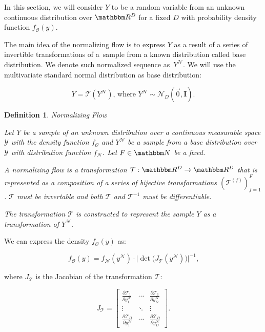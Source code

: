 \documentclass[shortabstract]{iithesis}
\newtheorem{definition}{Definition}
\begin{document}
In this section, we will consider $Y$ to be a random variable from an unknown continuous distribution over $\mathbbm R ^D$ for a fixed $D$ with probability density function $f_{\mathcal O} (y)$.

The main idea of the normalizing flow is to express $Y$ as a result of a series of invertible transformations of a~sample from a known distribution called base distribution. We denote such normalized sequence as~$Y^{\mathcal N}$. We will use the multivariate standard normal distribution as base distribution:

\begin{equation*}
    Y = \mathcal T (Y^{\mathcal N}) \text{, where } Y^{\mathcal N} \sim \mathcal N_D(\vec{0},  \textbf{I})\text{.}
\end{equation*}

\begin{definition} {Normalizing Flow}

    Let $Y$ be a sample of an unknown distribution over a continuous measurable space $\mathcal Y$ with the density function $f_{\mathcal O}$ and $Y^{\mathcal N}$ be a sample from a base distribution over $\mathcal Y$ with distribution function $f_{\mathcal N}$. Let $F \in \mathbbm N$ be a fixed.

    A normalizing flow is a transformation $\mathcal T: \mathbbm R ^D \rightarrow \mathbbm R ^D$ that is represented as a composition of a series of bijective transformations $(\mathcal T^{(f)})_{f=1}^F$. $\mathcal T$ must be invertable and both $\mathcal T$ and $\mathcal T^{-1}$ must be differentiable. 
    
    The transformation $\mathcal T$ is constructed to represent the sample $Y$ as a transformation of $Y^{\mathcal N}$. 
\end{definition}



We can express the density $f_{\mathcal O} (y)$ as:

\begin{equation} \label{eq:fo}
    f_{\mathcal O} (y) = f_{\mathcal N} (y^{\mathcal N}) \cdot \Big| \det \big(J_{\mathcal T}(y^{\mathcal N})\big) \Big| ^{-1}\text{,}
\end{equation}

where $J_{\mathcal T}$ is the Jacobian of the transformation $\mathcal T$:

\begin{equation*}
J_{\mathcal T}  = %
\begin{bmatrix}
  \frac{\partial \mathcal T_1}{\partial y^{\mathcal N}_1} & 
    \cdots & 
    \frac{\partial \mathcal T_1}{\partial y^{\mathcal N}_D} \\[1ex] %
 \vdots & \ddots & \vdots \\[1ex]
  \frac{\partial \mathcal T_D}{\partial y^{\mathcal N}_1} & 
    \cdots & 
    \frac{\partial \mathcal T_D}{\partial y^{\mathcal N}_D}
\end{bmatrix}\text{.}
\end{equation*}
\end{document}
